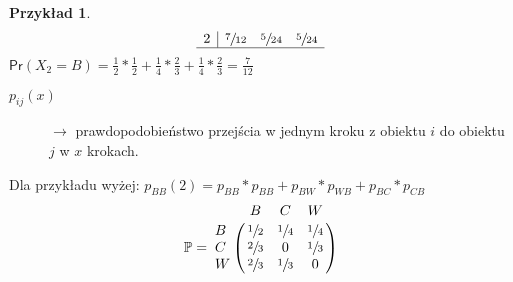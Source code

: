 \documentclass[a4paper,12pt]{article}
\theoremstyle{definition}%
\newtheorem{example}{Przykład}
\newtheorem*{example*}{Przykład} %
\theoremstyle{definition}
\theoremstyle{problem}
\begin{document}
\begin{example*}
$$\begin{array}{l|lll}
2 & \sfrac{7}{12} & \sfrac{5}{24} & \sfrac{5}{24} \\ \hline
\end{array}$$
$\mathsf{Pr}(X_2=B)=\frac{1}{2}*\frac{1}{2}+\frac{1}{4}*\frac{2}{3}+\frac{1}{4}*\frac{2}{3}=\frac{7}{12}$
\begin{description}
\item[$p_{ij}(x)$] $\rightarrow$ prawdopodobieństwo przejścia w jednym kroku z obiektu $i$ do obiektu $j$ w $x$ krokach.
\end{description}
Dla przykładu wyżej: $p_{BB}(2)=p_{BB}*p_{BB}+p_{BW}*p_{WB}+p_{BC}*p_{CB}$ 
$$\mathbb{P}= \bordermatrix{~ & B & C & W \cr
B & \sfrac{1}{2} & \sfrac{1}{4} & \sfrac{1}{4} \cr
C & \sfrac{2}{3} & 0 & \sfrac{1}{3}\cr
W & \sfrac{2}{3} & \sfrac{1}{3} &0 \cr}$$
\end{example*}
\end{document}
